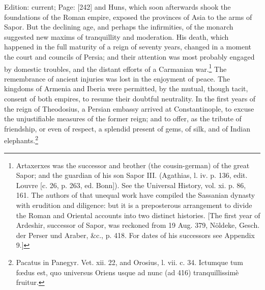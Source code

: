 Edition: current; Page: [242] and Huns, which soon afterwards shook the foundations of the Roman empire, exposed the provinces of Asia to the arms of Sapor. But the declining age, and perhaps the infirmities, of the monarch suggested new maxims of tranquillity and moderation. His death, which happened in the full maturity of a reign of seventy years, changed in a moment the court and councils of Persia; and their attention was most probably engaged by domestic troubles, and the distant efforts of a Carmanian war.\footnote{Artaxerxes was the successor and brother (the cousin-german) of the great Sapor; and the guardian of his son Sapor III. (Agathias, l. iv. p. 136, edit. Louvre [c. 26, p. 263, ed. Bonn]). See the Universal History, vol. xi. p. 86, 161. The authors of that unequal work have compiled the Sassanian dynasty with erudition and diligence: but it is a preposterous arrangement to divide the Roman and Oriental accounts into two distinct histories. [The first year of Ardeshir, successor of Sapor, was reckoned from 19 Aug. 379, Nöldeke, Gesch. der Perser und Araber, \&c., p. 418. For dates of his successors see Appendix 9.]} The remembrance of ancient injuries was lost in the enjoyment of peace. The kingdoms of Armenia and Iberia were permitted, by the mutual, though tacit, consent of both empires, to resume their doubtful neutrality. In the first years of the reign of Theodosius, a Persian embassy arrived at Constantinople, to excuse the unjustifiable measures of the former reign; and to offer, as the tribute of friendship, or even of respect, a splendid present of gems, of silk, and of Indian elephants.\footnote{Pacatus in Panegyr. Vet. xii. 22, and Orosius, l. vii. c. 34. Ictumque tum fœdus est, quo universus Oriens usque ad nunc (ad 416) tranquillissimè fruitur.}

